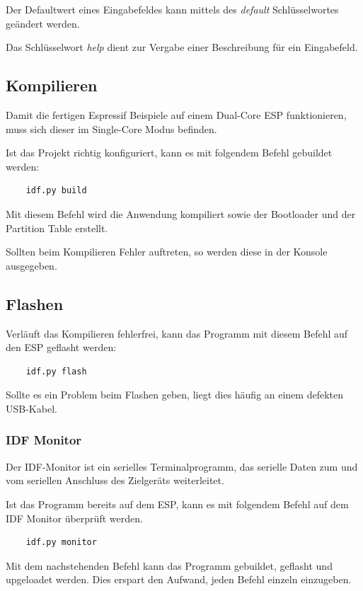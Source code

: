 Der Defaultwert eines Eingabefeldes kann mittels des \textit{default} Schlüsselwortes geändert werden. 

Das Schlüsselwort \textit{help} dient zur Vergabe einer Beschreibung für ein Eingabefeld.

\subsection{Kompilieren}
Damit die fertigen Espressif Beispiele auf einem Dual-Core ESP funktionieren, muss sich dieser im Single-Core Modus befinden.

Ist das Projekt richtig konfiguriert, kann es mit folgendem Befehl gebuildet werden:
\begin{verbatim}
    idf.py build
\end{verbatim}

Mit diesem Befehl wird die Anwendung kompiliert sowie der Bootloader und der Partition Table erstellt.

Sollten beim Kompilieren Fehler auftreten, so werden diese in der Konsole ausgegeben.

\subsection{Flashen}
Verläuft das Kompilieren fehlerfrei, kann das Programm mit diesem Befehl auf den ESP geflasht werden:
\begin{verbatim}
    idf.py flash
\end{verbatim}

Sollte es ein Problem beim Flashen geben, liegt dies häufig an einem defekten USB-Kabel.

\subsubsection{IDF Monitor}\label{sec:monitor}
Der IDF-Monitor ist ein serielles Terminalprogramm, das serielle Daten zum und vom seriellen Anschluss des Zielgeräts weiterleitet.

Ist das Programm bereits auf dem ESP, kann es mit folgendem Befehl auf dem IDF Monitor überprüft werden.

\begin{verbatim}
    idf.py monitor
\end{verbatim}

Mit dem nachstehenden Befehl kann das Programm gebuildet, geflasht und upgeloadet werden. Dies erspart den Aufwand, jeden Befehl einzeln einzugeben.

